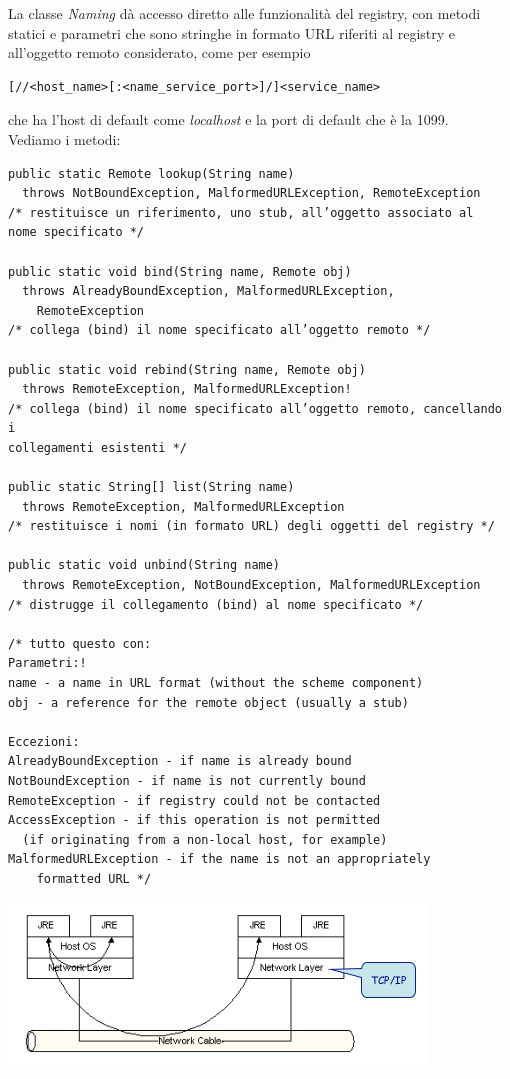 \documentclass[a4paper,12pt, oneside]{book}
\begin{document}
La classe\textit{ Naming} dà accesso diretto alle funzionalità del registry, con metodi statici
e parametri che sono stringhe in formato URL riferiti al registry e all’oggetto
remoto considerato, come per esempio\\
\begin{verbatim}
[//<host_name>[:<name_service_port>]/]<service_name>
\end{verbatim}
che ha l'host di default come \textit{localhost} e la port di default che è la 1099.\\
Vediamo i metodi:
\begin{verbatim}
public static Remote lookup(String name)
  throws NotBoundException, MalformedURLException, RemoteException
/* restituisce un riferimento, uno stub, all’oggetto associato al
nome specificato */

public static void bind(String name, Remote obj)
  throws AlreadyBoundException, MalformedURLException,
    RemoteException
/* collega (bind) il nome specificato all’oggetto remoto */

public static void rebind(String name, Remote obj)
  throws RemoteException, MalformedURLException!
/* collega (bind) il nome specificato all’oggetto remoto, cancellando i
collegamenti esistenti */

public static String[] list(String name)
  throws RemoteException, MalformedURLException
/* restituisce i nomi (in formato URL) degli oggetti del registry */

public static void unbind(String name)
  throws RemoteException, NotBoundException, MalformedURLException
/* distrugge il collegamento (bind) al nome specificato */

/* tutto questo con:
Parametri:!
name - a name in URL format (without the scheme component)
obj - a reference for the remote object (usually a stub) 

Eccezioni:
AlreadyBoundException - if name is already bound 
NotBoundException - if name is not currently bound 
RemoteException - if registry could not be contacted 
AccessException - if this operation is not permitted
  (if originating from a non-local host, for example)
MalformedURLException - if the name is not an appropriately
    formatted URL */
\end{verbatim}
\begin{center}
\includegraphics[scale=0.7]{img/rmi6.png}
\end{center}
\end{document}
